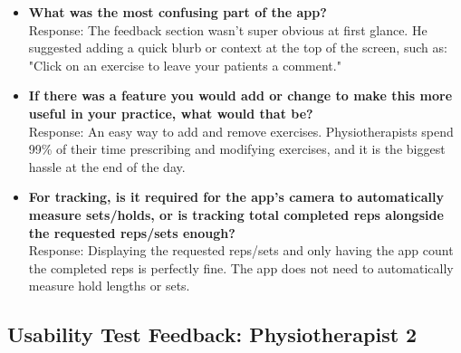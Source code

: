 \documentclass[12pt, titlepage]{article}
\begin{document}
\begin{itemize}
    \item \textbf{What was the most confusing part of the app?} \\
    Response: The feedback section wasn't super obvious at first glance. He suggested adding a quick blurb or context at the top of the screen, such as: "Click on an exercise to leave your patients a comment."

    \item \textbf{If there was a feature you would add or change to make this more useful in your practice, what would that be?} \\
    Response: An easy way to add and remove exercises. Physiotherapists spend 99\% of their time prescribing and modifying exercises, and it is the biggest hassle at the end of the day.

    \item \textbf{For tracking, is it required for the app's camera to automatically measure sets/holds, or is tracking total completed reps alongside the requested reps/sets enough?} \\
    Response: Displaying the requested reps/sets and only having the app count the completed reps is perfectly fine. The app does not need to automatically measure hold lengths or sets.
\end{itemize}
\subsection{Usability Test Feedback: Physiotherapist 2}
\end{document}
